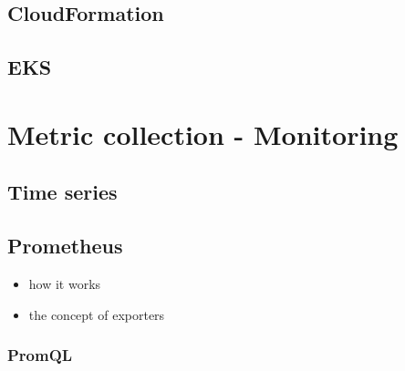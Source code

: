\subsection{CloudFormation} \label{cloudformation}

\subsection{EKS}


\section{Metric collection - Monitoring}

\subsection{Time series}

\subsection{Prometheus}

\begin{itemize}
	\item how it works
	\item the concept of exporters
\end{itemize}

\subsubsection{PromQL} \label{background-promql}


